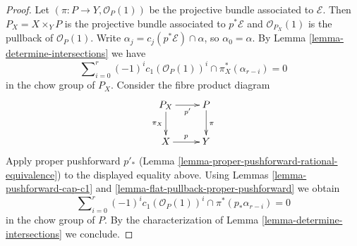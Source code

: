 \documentclass[10pt,a4paper]{amsart}
\theoremstyle{plain}
\theoremstyle{definition}
\theoremstyle{remark}
\numberwithin{equation}{subsection}
\begin{document}
\begin{proof}
Let $(\pi : P \to Y, \mathcal{O}_P(1))$ be the projective bundle associated
to $\mathcal{E}$. Then $P_X = X \times_Y P$ is the projective bundle associated
to $p^*\mathcal{E}$ and $\mathcal{O}_{P_X}(1)$ is the pullback of
$\mathcal{O}_P(1)$. Write $\alpha_j = c_j(p^*\mathcal{E}) \cap \alpha$, so
$\alpha_0 = \alpha$. By Lemma \ref{lemma-determine-intersections} we have
$$
\sum\nolimits_{i = 0}^r
(-1)^i c_1(\mathcal{O}_P(1))^i \cap
\pi_X^*(\alpha_{r - i}) = 0
$$
in the chow group of $P_X$. Consider the fibre product diagram
$$
\xymatrix{
P_X \ar[r]_-{p'} \ar[d]_{\pi_X} & P \ar[d]^\pi \\
X \ar[r]^p & Y
}
$$
Apply proper pushforward $p'_*$
(Lemma \ref{lemma-proper-pushforward-rational-equivalence})
to the displayed equality above. Using
Lemmas \ref{lemma-pushforward-cap-c1} and
\ref{lemma-flat-pullback-proper-pushforward} we obtain
$$
\sum\nolimits_{i = 0}^r
(-1)^i c_1(\mathcal{O}_P(1))^i \cap
\pi^*(p_*\alpha_{r - i}) = 0
$$
in the chow group of $P$. By the characterization of
Lemma \ref{lemma-determine-intersections} we conclude.
\end{proof}
\end{document}
